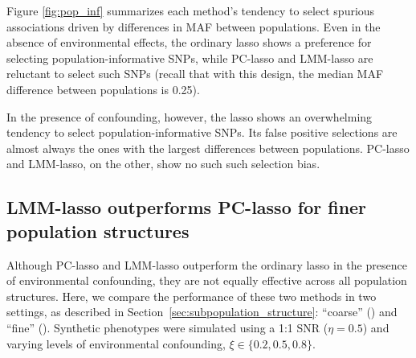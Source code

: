 Figure \ref{fig:pop_inf} summarizes each method's tendency to select spurious associations driven by differences in MAF between populations.  Even in the absence of environmental effects, the ordinary lasso shows a preference for selecting population-informative SNPs, while PC-lasso and LMM-lasso are reluctant to select such SNPs (recall that with this design, the median MAF difference between populations is 0.25).

In the presence of confounding, however, the lasso shows an overwhelming tendency to select population-informative SNPs.  Its false positive selections are almost always the ones with the largest differences between populations.  PC-lasso and LMM-lasso, on the other, show no such such selection bias.


\subsection{LMM-lasso outperforms PC-lasso for finer population structures}
\label{sec:sim-fine-coarse}


Although PC-lasso and LMM-lasso outperform the ordinary lasso in the presence of environmental confounding, they are not equally effective across all population structures.  Here, we compare the performance of these two methods in two settings, as described in Section~\ref{sec:subpopulation_structure}: ``coarse'' () and ``fine'' ().  Synthetic phenotypes were simulated using a 1:1 SNR ($\eta = 0.5$) and varying levels of environmental confounding, $\xi \in \{0.2, 0.5,0.8\}$. 

